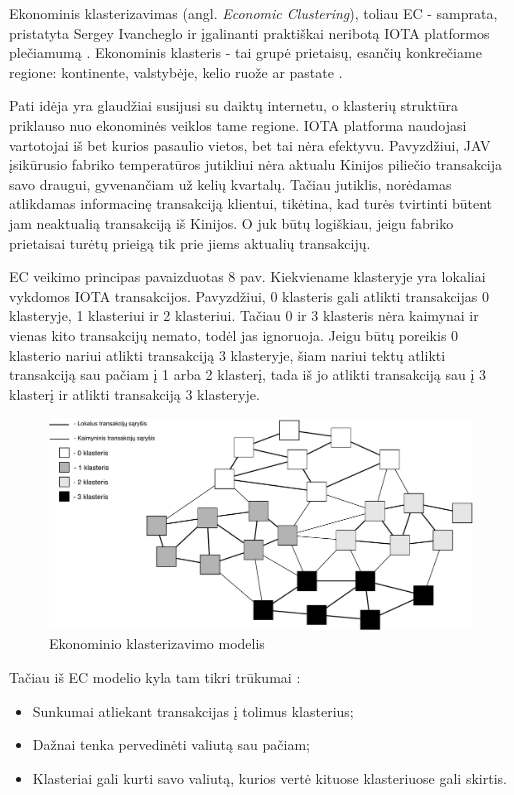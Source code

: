 Ekonominis klasterizavimas (angl. \textit{Economic Clustering}), toliau EC - samprata, pristatyta Sergey Ivancheglo ir įgalinanti praktiškai neribotą IOTA platformos plečiamumą \cite{sergey2018economic}.
Ekonominis klasteris - tai grupė prietaisų, esančių konkrečiame regione: kontinente, valstybėje, kelio ruože ar pastate \cite{sergey2018economic}. 

Pati idėja yra glaudžiai susijusi su daiktų internetu, o klasterių struktūra priklauso nuo ekonominės veiklos tame regione. IOTA platforma naudojasi vartotojai iš bet kurios pasaulio vietos, bet tai nėra efektyvu. Pavyzdžiui, JAV įsikūrusio fabriko temperatūros jutikliui nėra aktualu Kinijos piliečio transakcija savo draugui, gyvenančiam už kelių kvartalų. Tačiau jutiklis, norėdamas atlikdamas informacinę transakciją klientui, tikėtina, kad turės tvirtinti būtent jam neaktualią transakciją iš Kinijos. O juk būtų logiškiau, jeigu fabriko prietaisai turėtų prieigą tik prie jiems aktualių transakcijų.

EC veikimo principas pavaizduotas 8 pav. Kiekviename klasteryje yra lokaliai vykdomos IOTA transakcijos. Pavyzdžiui, 0 klasteris gali atlikti transakcijas 0 klasteryje, 1 klasteriui ir 2 klasteriui. Tačiau 0 ir 3 klasteris nėra kaimynai ir vienas kito transakcijų nemato, todėl jas ignoruoja. Jeigu būtų poreikis 0 klasterio nariui atlikti transakciją 3 klasteryje, šiam nariui tektų atlikti transakciją sau pačiam į 1 arba 2 klasterį, tada iš jo atlikti transakciją sau į 3 klasterį ir atlikti transakciją 3 klasteryje.

\begin{figure}[H]
    \centering
    \includegraphics[scale=0.7]{images/economic-clusters}
    \caption{Ekonominio klasterizavimo modelis}
\end{figure}

Tačiau iš EC modelio kyla tam tikri trūkumai \cite{sergey2018economic}: 
\begin{itemize}
    \item Sunkumai atliekant transakcijas į tolimus klasterius;
    \item Dažnai tenka pervedinėti valiutą sau pačiam;
    \item Klasteriai gali kurti savo valiutą, kurios vertė kituose klasteriuose gali skirtis.
\end{itemize} 

